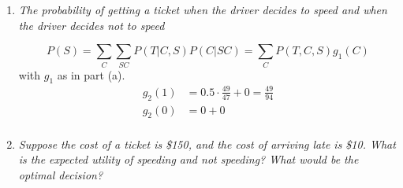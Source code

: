 \documentclass{article}
\begin{document}
\begin{enumerate}[(a)]
\begin{enumerate}
 

  \item \textit{The probability of getting a ticket when the driver decides to 
    speed and when the driver decides not to speed}

$$P(S)=\sum_C\sum_{SC}P(T|C,S)P(C|SC)=\sum_C P(T,C,S)g_1(C)$$
with $g_1$ as in part (a).
\begin{align*}
g_2(1) &= 0.5\cdot \frac{49}{47}+0=\frac{49}{94}\\
g_2(0) &= 0 + 0\\
\end{align*}



  \item \textit{Suppose the cost of a ticket is \$150, and the cost of arriving 
    late is \$10. What is the expected utility of speeding and not speeding?
    What would be the optimal decision?}




  \end{enumerate}
\end{enumerate}
\end{document}
